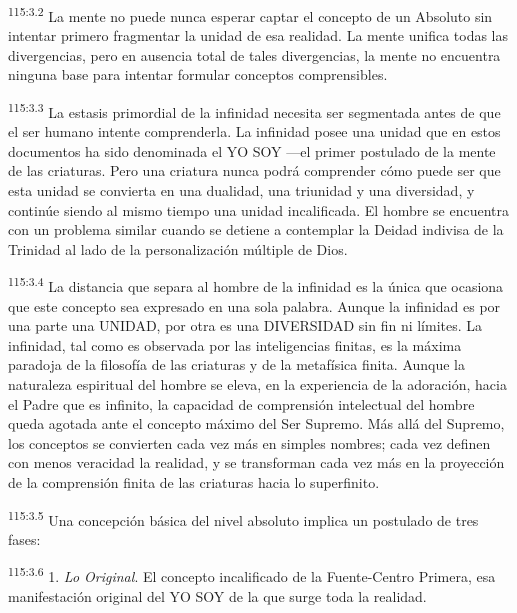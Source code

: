 \documentclass[twoside, 11pt]{book}
\begin{document}
\par
\textsuperscript{115:3.2} La mente no puede nunca esperar captar el concepto de un Absoluto sin intentar primero fragmentar la unidad de esa realidad. La mente unifica todas las divergencias, pero en ausencia total de tales divergencias, la mente no encuentra ninguna base para intentar formular conceptos comprensibles.

\par
\textsuperscript{115:3.3} La estasis primordial de la infinidad necesita ser segmentada antes de que el ser humano intente comprenderla. La infinidad posee una unidad que en estos documentos ha sido denominada el YO SOY ---el primer postulado de la mente de las criaturas. Pero una criatura nunca podrá comprender cómo puede ser que esta unidad se convierta en una dualidad, una triunidad y una diversidad, y continúe siendo al mismo tiempo una unidad incalificada. El hombre se encuentra con un problema similar cuando se detiene a contemplar la Deidad indivisa de la Trinidad al lado de la personalización múltiple de Dios.

\par
\textsuperscript{115:3.4} La distancia que separa al hombre de la infinidad es la única que ocasiona que este concepto sea expresado en una sola palabra. Aunque la infinidad es por una parte una UNIDAD, por otra es una DIVERSIDAD sin fin ni límites. La infinidad, tal como es observada por las inteligencias finitas, es la máxima paradoja de la filosofía de las criaturas y de la metafísica finita. Aunque la naturaleza espiritual del hombre se eleva, en la experiencia de la adoración, hacia el Padre que es infinito, la capacidad de comprensión intelectual del hombre queda agotada ante el concepto máximo del Ser Supremo. Más allá del Supremo, los conceptos se convierten cada vez más en simples nombres; cada vez definen con menos veracidad la realidad, y se transforman cada vez más en la proyección de la comprensión finita de las criaturas hacia lo superfinito.

\par
\textsuperscript{115:3.5} Una concepción básica del nivel absoluto implica un postulado de tres fases:

\par
\textsuperscript{115:3.6} 1. \textit{Lo Original}. El concepto incalificado de la Fuente-Centro Primera, esa manifestación original del YO SOY de la que surge toda la realidad.
\end{document}
